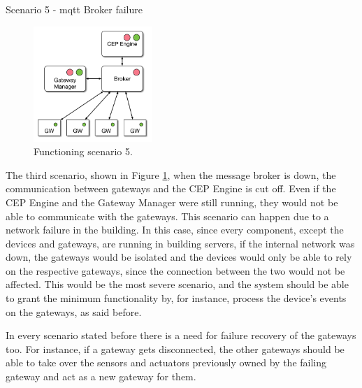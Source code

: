 \begin{Paragraph}{Scenario 5 - \ac{mqtt} Broker failure}
	
	\begin{figure}[H]
		\centering
		\includegraphics[width=0.4\textwidth]{figures/fs3.png}
		\caption{Functioning scenario 5.}
		\label{fig:sc5}
	\end{figure}
	
	The third scenario, shown in Figure \ref{fig:sc5}, when the message broker is down, the communication between gateways and the CEP Engine is cut off. Even if the CEP Engine and the Gateway Manager were still running, they would not be able to communicate with the gateways. This scenario can happen due to a network failure in the building. In this case, since every component, except the devices and gateways, are running in building servers, if the internal network was down, the gateways would be isolated and the devices would only be able to rely on the respective gateways, since the connection between the two would not be affected. This would be the most severe scenario, and the system should be able to grant the minimum functionality by, for instance, process the device’s events on the gateways, as said before.

	
\end{Paragraph}


In every scenario stated before there is a need for failure recovery of the gateways too. For instance, if a gateway gets disconnected, the other gateways should be able to take over the sensors and actuators previously owned by the failing gateway and act as a new gateway for them.







